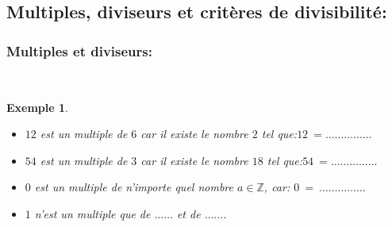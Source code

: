 \documentclass[a4paper,10.5pt]{article}
\newtheorem{defi}{Définition}
\newtheorem{ex}{Exemple}
\begin{document}
\subsection{Multiples, diviseurs et critères de divisibilité:}
\subsubsection{Multiples et diviseurs:}	
\noindent{}
\hfill\\
\begin{ex}\hfill\\[-0.25cm]
	\begin{itemize}
		\item[$\square$] $12$ est un multiple de $6$ car il existe le nombre $2$ tel que:\quad $12 \ = \dots\dots\dots\dots\dots $\\
		\item[$\square$] $54$ est un multiple de $3$ car il existe le nombre $18$ tel que:\quad $54 \ = \dots\dots\dots\dots\dots $\\
		\item[$\square$] $0$ est un multiple de n'importe quel nombre $a\in\mathbb{Z}$, car: $ 0 \ = \ \dots\dots\dots\dots\dots  $\\
		\item[$\square$] $1$ n'est un multiple que de $\dots \dots$ et de $\dots \dots$.\\
	\end{itemize}
\end{ex}
\noindent{}
\hfill\\
\end{document}

